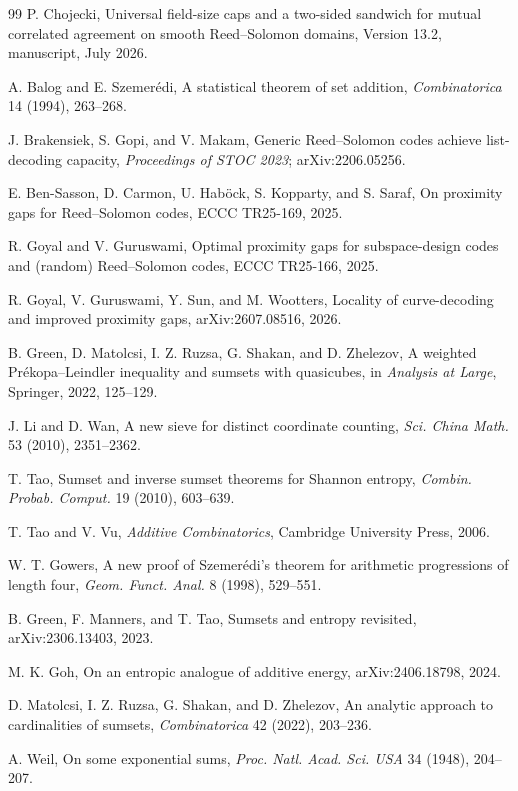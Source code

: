 \documentclass[11pt,a4paper]{amsart}
\numberwithin{equation}{section}
\theoremstyle{remark}
\begin{document}
\begin{thebibliography}{99}
P. Chojecki,
\newblock Universal field-size caps and a two-sided sandwich for mutual correlated agreement on smooth Reed--Solomon domains,
\newblock Version 13.2, manuscript, July 2026.

A. Balog and E. Szemer\'edi,
\newblock A statistical theorem of set addition,
\newblock \emph{Combinatorica} 14 (1994), 263--268.

J. Brakensiek, S. Gopi, and V. Makam,
\newblock Generic Reed--Solomon codes achieve list-decoding capacity,
\newblock \emph{Proceedings of STOC 2023}; arXiv:2206.05256.

E. Ben-Sasson, D. Carmon, U. Hab\"ock, S. Kopparty, and S. Saraf,
\newblock On proximity gaps for Reed--Solomon codes,
\newblock ECCC TR25-169, 2025.

R. Goyal and V. Guruswami,
\newblock Optimal proximity gaps for subspace-design codes and (random) Reed--Solomon codes,
\newblock ECCC TR25-166, 2025.

R. Goyal, V. Guruswami, Y. Sun, and M. Wootters,
\newblock Locality of curve-decoding and improved proximity gaps,
\newblock arXiv:2607.08516, 2026.

B. Green, D. Matolcsi, I. Z. Ruzsa, G. Shakan, and D. Zhelezov,
\newblock A weighted Pr\'ekopa--Leindler inequality and sumsets with quasicubes,
\newblock in \emph{Analysis at Large}, Springer, 2022, 125--129.

J. Li and D. Wan,
\newblock A new sieve for distinct coordinate counting,
\newblock \emph{Sci. China Math.} 53 (2010), 2351--2362.

T. Tao,
\newblock Sumset and inverse sumset theorems for Shannon entropy,
\newblock \emph{Combin. Probab. Comput.} 19 (2010), 603--639.

T. Tao and V. Vu,
\newblock \emph{Additive Combinatorics},
\newblock Cambridge University Press, 2006.

W. T. Gowers,
\newblock A new proof of Szemer\'edi's theorem for arithmetic progressions of length four,
\newblock \emph{Geom. Funct. Anal.} 8 (1998), 529--551.

B. Green, F. Manners, and T. Tao,
\newblock Sumsets and entropy revisited,
\newblock arXiv:2306.13403, 2023.

M. K. Goh,
\newblock On an entropic analogue of additive energy,
\newblock arXiv:2406.18798, 2024.

D. Matolcsi, I. Z. Ruzsa, G. Shakan, and D. Zhelezov,
\newblock An analytic approach to cardinalities of sumsets,
\newblock \emph{Combinatorica} 42 (2022), 203--236.

A. Weil,
\newblock On some exponential sums,
\newblock \emph{Proc. Natl. Acad. Sci. USA} 34 (1948), 204--207.
\end{thebibliography}
\end{document}
